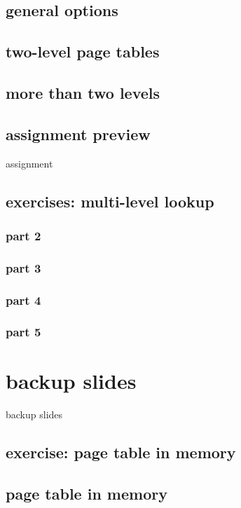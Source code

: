 \subsection{general options}


\subsection{two-level page tables}




\subsection{more than two levels}


\subsection{assignment preview}
\begin{frame}{assignment}
\end{frame}

\subsection{exercises: multi-level lookup}
\subsubsection{part 2}

\subsubsection{part 3}


\subsubsection{part 4}

\subsubsection{part 5}


\section{backup slides}
\begin{frame}{backup slides}
\end{frame}
\subsection{exercise: page table in memory}

\subsection{page table in memory}



